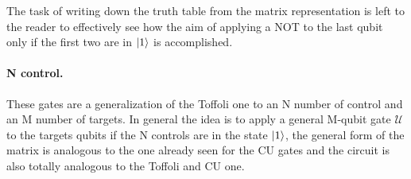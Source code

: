 \noindent
The task of writing down the truth table from the matrix representation is left to the reader to effectively see how the aim of applying a NOT to the last qubit only if the first two are in $\ket{1}$ is accomplished.

\paragraph{N control.} These gates are a generalization of the Toffoli one to an N number of control and an M number of targets. In general the idea is to apply a general M-qubit gate $\mathcal{U}$ to the targets qubits if the N controls are in the state $\ket{1}$, the general form of the matrix is analogous to the one already seen for the CU gates and the circuit is also totally analogous to the Toffoli and CU one. 